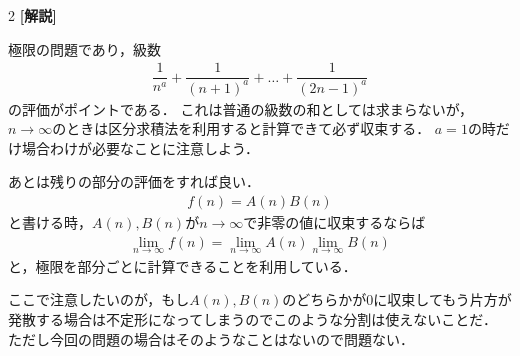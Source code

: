 \documentclass[../../main.tex]{subfiles}
\begin{document}
\begin{multicols}{2}
  {\bf [解説]}

  極限の問題であり，級数
  \begin{align}
    \dfrac{1}{n^a} + \dfrac{1}{(n+1)^a} + \dots + \dfrac{1}{(2n-1)^a}
  \end{align}
  の評価がポイントである．
  これは普通の級数の和としては求まらないが，$n\to\infty$のときは区分求積法を利用すると計算できて必ず収束する．
  $a=1$の時だけ場合わけが必要なことに注意しよう．

  あとは残りの部分の評価をすれば良い．
  \begin{align}
    f(n) = A(n)B(n)
  \end{align}
  と書ける時，$A(n), B(n)$が$n\to\infty$で非零の値に収束するならば
  \begin{align}
    \lim_{n\to\infty} f(n) = \lim_{n\to\infty}A(n) \lim_{n\to\infty}B(n)
  \end{align}
  と，極限を部分ごとに計算できることを利用している．

  ここで注意したいのが，もし$A(n),B(n)$のどちらかが$0$に収束してもう片方が発散する場合は不定形になってしまうのでこのような分割は使えないことだ．
  ただし今回の問題の場合はそのようなことはないので問題ない．

  \newpage
\end{multicols}
\end{document}
